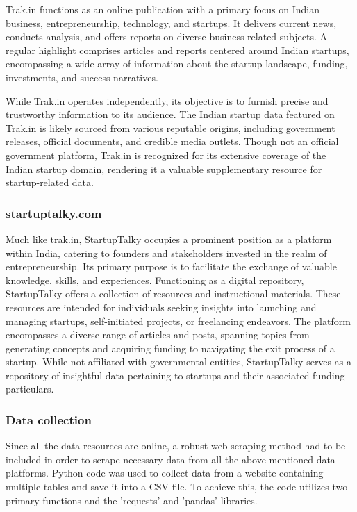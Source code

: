 \documentclass[12pt]{article}
\begin{document}
Trak.in functions as an online publication with a primary focus on Indian business, entrepreneurship, technology, and startups. It delivers current news, conducts analysis, and offers reports on diverse business-related subjects. A regular highlight comprises articles and reports centered around Indian startups, encompassing a wide array of information about the startup landscape, funding, investments, and success narratives.

While Trak.in operates independently, its objective is to furnish precise and trustworthy information to its audience. The Indian startup data featured on Trak.in is likely sourced from various reputable origins, including government releases, official documents, and credible media outlets. Though not an official government platform, Trak.in is recognized for its extensive coverage of the Indian startup domain, rendering it a valuable supplementary resource for startup-related data.

\subsubsection{startuptalky.com}

Much like trak.in, StartupTalky occupies a prominent position as a platform within India, catering to founders and stakeholders invested in the realm of entrepreneurship. Its primary purpose is to facilitate the exchange of valuable knowledge, skills, and experiences. Functioning as a digital repository, StartupTalky offers a collection of resources and instructional materials. These resources are intended for individuals seeking insights into launching and managing startups, self-initiated projects, or freelancing endeavors. The platform encompasses a diverse range of articles and posts, spanning topics from generating concepts and acquiring funding to navigating the exit process of a startup. While not affiliated with governmental entities, StartupTalky serves as a repository of insightful data pertaining to startups and their associated funding particulars.

\subsubsection{Data collection}

Since all the data resources are online, a robust web scraping method had to be included in order to scrape necessary data from all the above-mentioned data platforms. Python code was used to collect data from a website containing multiple tables and save it into a CSV file. To achieve this, the code utilizes two primary functions and the 'requests' and 'pandas' libraries.
\end{document}
